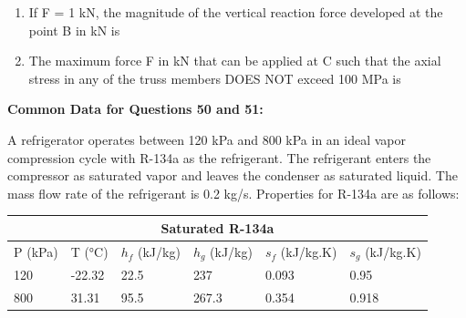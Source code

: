 \documentclass[journal,12pt,onecolumn]{IEEEtran}
\begin{document}
\begin{enumerate}[resume]

    \item If F = 1 kN, the magnitude of the vertical reaction force developed at the point B in kN is

          \begin{enumerate}
          \end{enumerate}

    \item The maximum force F in kN that can be applied at C such that the axial stress in any of the truss members DOES NOT exceed 100 MPa is

          \begin{enumerate}
          \end{enumerate}

\end{enumerate}

\normalsize\textbf{Common Data for Questions 50 and 51:}

A refrigerator operates between 120 kPa and 800 kPa in an ideal vapor compression cycle with R-134a as the refrigerant. The refrigerant enters the compressor as saturated vapor and leaves the condenser as saturated liquid. The mass flow rate of the refrigerant is 0.2 kg/s. Properties for R-134a are as follows:

\begin{table}[H]
    \centering
    \begin{tabular}{|l|l|l|l|l|l|}
        \hline
        \multicolumn{6}{|c|}{\textbf{Saturated R-134a}}                                              \\
        \hline
        P (kPa) & T (°C) & \(h_f\) (kJ/kg) & \(h_g\) (kJ/kg) & \(s_f\) (kJ/kg.K) & \(s_g\) (kJ/kg.K) \\
        \hline
        120     & -22.32 & 22.5            & 237             & 0.093             & 0.95              \\
        800     & 31.31  & 95.5            & 267.3           & 0.354             & 0.918             \\
        \hline
    \end{tabular}
\end{table}
\end{document}
